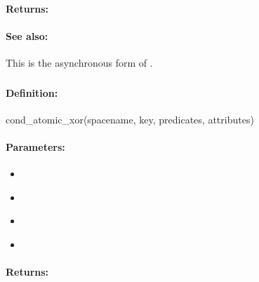 \paragraph{Returns:}


\paragraph{See also:}  This is the asynchronous form of .

\pagebreak
\subsubsection{}
\label{api:ruby:cond_atomic_xor}


\paragraph{Definition:}
\begin{rubycode}
cond_atomic_xor(spacename, key, predicates, attributes)
\end{rubycode}

\paragraph{Parameters:}
\begin{itemize}[noitemsep]
\item {}\\

\item {}\\

\item {}\\

\item {}\\

\end{itemize}

\paragraph{Returns:}


